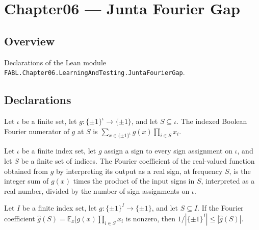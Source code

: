 \chapter{Chapter06 — Junta Fourier Gap}
\section{Overview}

Declarations of the Lean module \texttt{FABL.Chapter06.LearningAndTesting.JuntaFourierGap}.

\section{Declarations}

\begin{definition}
\label{FABL.indexedBooleanFourierNumerator}
\leanok
{}
Let $\iota$ be a finite set, let $g:\{\pm1\}^{\iota}\to\{\pm1\}$, and let
$S\subseteq\iota$. The indexed Boolean Fourier numerator of $g$ at $S$ is
$\sum_{x\in\{\pm1\}^{\iota}} g(x)\prod_{i\in S}x_i$.
\end{definition}

\begin{theorem}
\label{FABL.indexedFourierCoeff_toReal_eq_numerator_div}
\leanok
{}
Let $\iota$ be a finite index set, let $g$ assign a sign to every sign assignment on
$\iota$, and let $S$ be a finite set of indices. The Fourier coefficient of the
real-valued function obtained from $g$ by interpreting its output as a real sign, at
frequency $S$, is the integer sum of $g(x)$ times the product of the input signs in $S$,
interpreted as a real number, divided by the number of sign assignments on $\iota$.
\end{theorem}

\begin{theorem}
\label{FABL.one_div_card_le_abs_indexedFourierCoeff_toReal_of_ne_zero}
\leanok
{}
Let $I$ be a finite index set, let $g:\{\pm1\}^I\to\{\pm1\}$, and let $S\subseteq I$.
If the Fourier coefficient $\widehat g(S)=\mathbb E_x[g(x)\prod_{i\in S}x_i$ is nonzero,
then $1/|\{\pm1\}^I|\le |\widehat g(S)|$.
\end{theorem}

